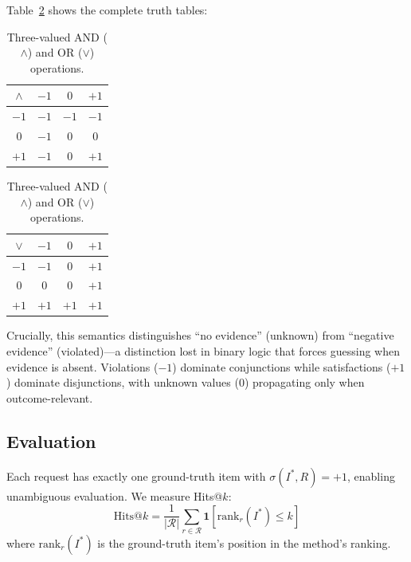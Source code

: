 \noindent Table~\ref{tab:three-valued} shows the complete truth tables:

\begin{table}[h]
\centering
\caption{Three-valued AND ($\land$) and OR ($\lor$) operations.}
\label{tab:three-valued}
\small
\begin{tabular}{c|ccc}
$\land$ & $-1$ & $0$ & $+1$ \\
\hline
$-1$ & $-1$ & $-1$ & $-1$ \\
$0$  & $-1$ & $0$  & $0$  \\
$+1$ & $-1$ & $0$  & $+1$ \\
\end{tabular}
\quad
\begin{tabular}{c|ccc}
$\lor$ & $-1$ & $0$ & $+1$ \\
\hline
$-1$ & $-1$ & $0$  & $+1$ \\
$0$  & $0$  & $0$  & $+1$ \\
$+1$ & $+1$ & $+1$ & $+1$ \\
\end{tabular}
\end{table}

\noindent Crucially, this semantics distinguishes ``no evidence'' (unknown) from ``negative evidence'' (violated)---a distinction lost in binary logic that forces guessing when evidence is absent.
Violations ($-1$) dominate conjunctions while satisfactions ($+1$) dominate disjunctions, with unknown values ($0$) propagating only when outcome-relevant.

\subsection{Evaluation}

Each request has exactly one ground-truth item with $\sigma(I^*, R) = +1$, enabling unambiguous evaluation.
We measure Hits@$k$:
\begin{equation}
    \text{Hits@}k = \frac{1}{|\mathcal{R}|} \sum_{r \in \mathcal{R}} \mathbf{1}[\text{rank}_r(I^*) \leq k]
\end{equation}
where $\text{rank}_r(I^*)$ is the ground-truth item's position in the method's ranking.
